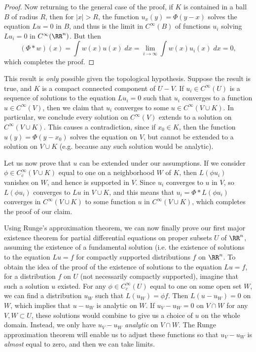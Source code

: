 \begin{proof}
    Now returning to the general case of the proof, if $K$ is contained in a ball $B$ of radius $R$, then for $|x| > R$, the function $u_x(y) = \Phi(y-x)$ solves the equation $Lu = 0$ in $B$, and thus is the limit in $C^\infty(B)$ of functions $u_i$ solving $Lu_i = 0$ in $C^\infty(\RR^n)$. But then
    \[ (\Phi * w)(x) = \int w(x) u(x)\; dx = \lim_{i \to \infty} \int w(x) u_i(x)\; dx = 0, \]
    which completes the proof.
\end{proof}

\begin{remark}
    This result is \emph{only} possible given the topological hypothesis. Suppose the result is true, and $K$ is a compact connected component of $U - V$. If $u_i \in C^\infty(U)$ is a sequence of solutions to the equation $Lu_i = 0$ such that $u_i$ converges to a function $u \in C^\infty(V)$, then we claim that $u_i$ converges to some $u \in C^\infty(V \cup K)$. In particular, we conclude every solution on $C^\infty(V)$ extends to a solution on $C^\infty(V \cup K)$. This causes a contradiction, since if $x_0 \in K$, then the function $u(y) = \Phi(y - x_0)$ solves the equation on $V$, but cannot be extended to a solution on $V \cup K$ (e.g. because any such solution would be analytic).

    Let us now prove that $u$ can be extended under our assumptions. If we consider $\phi \in C_c^\infty(V \cup K)$ equal to one on a neighborhood $W$ of $K$, then $L(\phi u_i)$ vanishes on $W$, and hence is supported in $V$. Since $u_i$ converges to $u$ in $V$, so $L(\phi u_i)$ converges to $Lu$ in $V \cup K$, and this means that $u_i = \Phi * L(\phi u_i)$ converges in $C^\infty(V \cup K)$ to some function $u$ in $C^\infty(V \cup K)$, which completes the proof of our claim.
\end{remark}

Using Runge's approximation theorem, we can now finally prove our first major existence theorem for partial differential equations on proper subsets $U$ of $\RR^n$, assuming the existence of a fundamental solution (i.e. the existence of solutions to the equation $Lu = f$ for compactly supported distributions $f$ on $\RR^n$. To obtain the idea of the proof of the existence of solutions to the equation $Lu = f$, for a distribution $f$ on $U$ (not necessarily compactly supported), imagine that such a solution $u$ existed. For any $\phi \in C_c^\infty(U)$ equal to one on some open set $W$, we can find a distribution $u_W$ such that $L(u_W) = \phi f$. Then $L(u - u_W) = 0$ on $W$, which implies that $u - u_W$ is analytic on $W$. If $u_V - u_W = 0$ on $V \cap W$ for any $V,W \subset U$, these solutions would combine to give us a choice of $u$ on the whole domain. Instead, we only have $u_V - u_W$ \emph{analytic} on $V \cap W$. The Runge approximation theorem will enable us to adjust these functions so that $u_V - u_W$ is \emph{almost} equal to zero, and then we can take limits.

